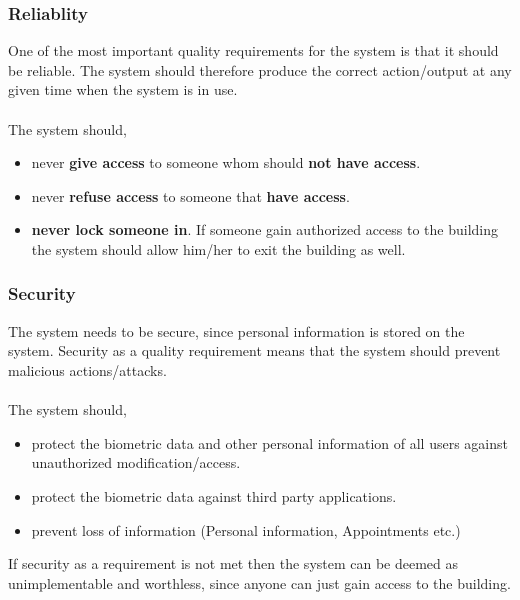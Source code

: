 \subsubsection{Reliablity}
One of the most important quality requirements for the system is that it should be reliable.
The system should therefore produce the correct action/output at any given time when the system is in use.\\
\\The system should,
\begin{itemize}
	\item  never \textbf{give access} to someone whom should \textbf{not have access}.
	\item  never \textbf{refuse access} to someone that\textbf{ have access}. 
	\item  \textbf{never lock someone in}. If someone gain authorized access to the building the system should 				allow him/her to exit the building as well.
\end{itemize}

\subsubsection{Security}
The system needs to be secure, since personal information is stored on the system. Security as a quality requirement means that the system should prevent malicious actions/attacks.\\
\\The system should,
\begin{itemize}
	\item  protect the biometric data and other personal information of all users against unauthorized modification/access.
	\item  protect the biometric data against third party applications.
	\item  prevent loss of information (Personal information, Appointments etc.)
\end{itemize}

If security as a requirement is not met then the system can be deemed as unimplementable and worthless, since anyone can just gain access to the building.

